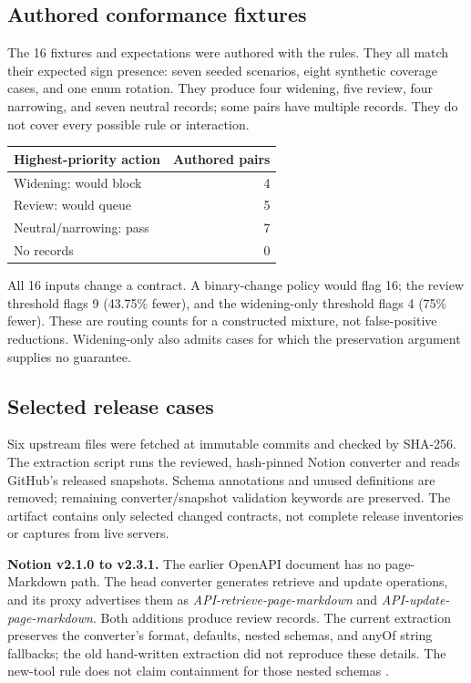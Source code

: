 \subsection{Authored conformance fixtures}\label{authored-conformance-fixtures}

The 16 fixtures and expectations were authored with the rules. They all match their expected sign presence: seven seeded scenarios, eight synthetic coverage cases, and one enum rotation. They produce four widening, five review, four narrowing, and seven neutral records; some pairs have multiple records. They do not cover every possible rule or interaction.

{\def\LTcaptype{none} %
\begin{longtable}[]{@{}lr@{}}
\toprule\noalign{}
Highest-priority action & Authored pairs \\
\midrule\noalign{}
\endhead
\bottomrule\noalign{}
\endlastfoot
Widening: would block & 4 \\
Review: would queue & 5 \\
Neutral/narrowing: pass & 7 \\
No records & 0 \\
\end{longtable}
}

All 16 inputs change a contract. A binary-change policy would flag 16; the review threshold flags 9 (43.75\% fewer), and the widening-only threshold flags 4 (75\% fewer). These are routing counts for a constructed mixture, not false-positive reductions. Widening-only also admits cases for which the preservation argument supplies no guarantee.

\subsection{Selected release cases}\label{selected-release-cases}

Six upstream files were fetched at immutable commits and checked by SHA-256. The extraction script runs the reviewed, hash-pinned Notion converter and reads GitHub's released snapshots. Schema annotations and unused definitions are removed; remaining converter/snapshot validation keywords are preserved. The artifact contains only selected changed contracts, not complete release inventories or captures from live servers.

\textbf{Notion v2.1.0 to v2.3.1.} The earlier OpenAPI document has no page-Markdown path. The head converter generates retrieve and update operations, and its proxy advertises them as \emph{API-retrieve-page-markdown} and \emph{API-update-page-markdown}. Both additions produce review records. The current extraction preserves the converter's format, defaults, nested schemas, and anyOf string fallbacks; the old hand-written extraction did not reproduce these details. The new-tool rule does not claim containment for those nested schemas \citep{notion-parser, notion-proxy}.


